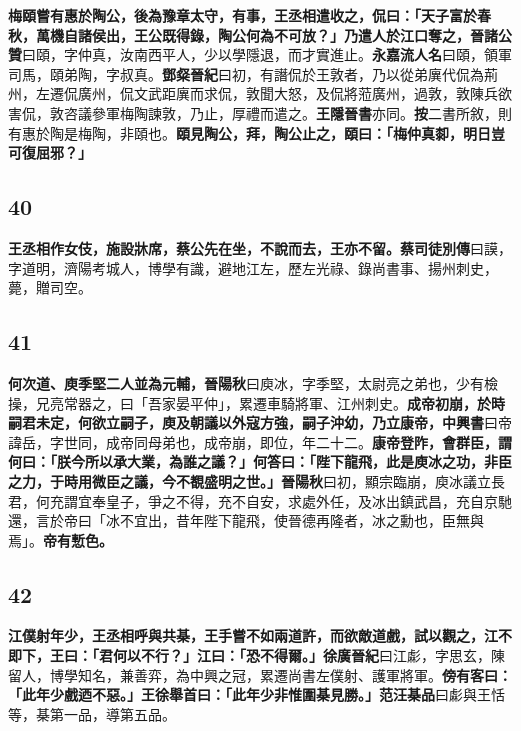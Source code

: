 \textbf{梅頤嘗有惠於陶公，後為豫章太守，有事，王丞相遣收之，侃曰：「天子富於春秋，萬機自諸侯出，王公既得錄，陶公何為不可放？」乃遣人於江口奪之，}{\footnotesize \textbf{晉諸公贊}曰頤，字仲真，汝南西平人，少以學隱退，而才實進止。\textbf{永嘉流人名}曰頤，領軍司馬，頤弟陶，字叔真。\textbf{鄧粲晉紀}曰初，有譖侃於王敦者，乃以從弟廙代侃為荊州，左遷侃廣州，侃文武距廙而求侃，敦聞大怒，及侃將蒞廣州，過敦，敦陳兵欲害侃，敦咨議參軍梅陶諫敦，乃止，厚禮而遣之。\textbf{王隱晉書}亦同。\textbf{按}二書所敘，則有惠於陶是梅陶，非頤也。}\textbf{頤見陶公，拜，陶公止之，頤曰：「梅仲真厀，明日豈可復屈邪？」}

\subsection*{40}

\textbf{王丞相作女伎，施設牀席，蔡公先在坐，不說而去，王亦不留。}{\footnotesize \textbf{蔡司徒別傳}曰謨，字道明，濟陽考城人，博學有識，避地江左，歷左光祿、錄尚書事、揚州刺史，薨，贈司空。}

\subsection*{41}

\textbf{何次道、庾季堅二人並為元輔，}{\footnotesize \textbf{晉陽秋}曰庾冰，字季堅，太尉亮之弟也，少有檢操，兄亮常器之，曰「吾家晏平仲」，累遷車騎將軍、江州刺史。}\textbf{成帝初崩，於時嗣君未定，何欲立嗣子，庾及朝議以外寇方強，嗣子沖幼，乃立康帝，}{\footnotesize \textbf{中興書}曰帝諱岳，字世同，成帝同母弟也，成帝崩，即位，年二十二。}\textbf{康帝登阼，會群臣，謂何曰：「朕今所以承大業，為誰之議？」何答曰：「陛下龍飛，此是庾冰之功，非臣之力，于時用微臣之議，今不覩盛明之世。」}{\footnotesize \textbf{晉陽秋}曰初，顯宗臨崩，庾冰議立長君，何充謂宜奉皇子，爭之不得，充不自安，求處外任，及冰出鎮武昌，充自京馳還，言於帝曰「冰不宜出，昔年陛下龍飛，使晉德再隆者，冰之勳也，臣無與焉」。}\textbf{帝有慙色。}

\subsection*{42}

\textbf{江僕射年少，王丞相呼與共棊，王手嘗不如兩道許，而欲敵道戲，試以觀之，江不即下，王曰：「君何以不行？」江曰：「恐不得爾。」}{\footnotesize \textbf{徐廣晉紀}曰江虨，字思玄，陳留人，博學知名，兼善弈，為中興之冠，累遷尚書左僕射、護軍將軍。}\textbf{傍有客曰：「此年少戲迺不惡。」王徐舉首曰：「此年少非惟圍棊見勝。」}{\footnotesize \textbf{范汪棊品}曰虨與王恬等，棊第一品，導第五品。}

